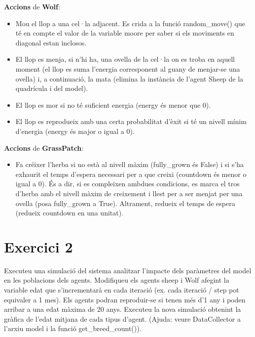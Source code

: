 \documentclass{article} %
\begin{document}
{	\textbf{Accions} de \textbf{Wolf}:

	\begin{itemize}
		\item Mou el llop a una cel·la adjacent. Es crida a la funció {\selectfont\small random\_move()} que té en compte el valor de la variable {\selectfont\small moore} per saber si els moviments en diagonal estan inclosos.
		\item El llop es menja, si n'hi ha, una ovella de la cel·la on es troba en aquell moment (el llop es suma l'energia corresponent al guany de menjar-se una ovella) i, a continuació, la mata (elimina la instància de l'agent {\selectfont\small Sheep} de la quadrícula i del model).
		\item El llop es mor si no té suficient energia ({\selectfont\small energy} és menor que 0).
		\item El llop es reprodueix amb una certa probabilitat d'èxit si té un nivell mínim d'energia ({\selectfont\small energy} és major o igual a 0).
	\end{itemize}

	\textbf{Accions} de \textbf{GrassPatch}:

	\begin{itemize}
		\item Fa créixer l'herba si no està al nivell màxim ({\selectfont\small fully\_grown} és {\selectfont\small False}) i si s'ha exhaurit el temps d'espera necessari per a que creixi ({\selectfont\small countdown} és menor o igual a 0). És a dir, si es compleixen ambdues condicions, es marca el tros d'herba amb el nivell màxim de creixement i llest per a ser menjat per una ovella (posa {\selectfont\small fully\_grown} a {\selectfont\small True}). Altrament, redueix el temps de espera (redueix {\selectfont\small countdown} en una unitat).
	\end{itemize}
}

\section{Exercici 2}
Executeu una simulació del sistema analitzar l'impacte dels paràmetres del model en les poblacions dels agents. Modifiqueu els agents sheep i Wolf afegint la variable edat que s'incrementarà en cada iteració (ex. cada iteració / step pot equivaler a 1 mes). Els agents podran reproduir-se si tenen més d'1 any i poden arribar a una edat màxima de 20 anys. Executeu la nova simulació obtenint la gràfica de l'edat mitjana de cada tipus d'agent. (Ajuda: veure DataCollector a l'arxiu model i la funció get\_breed\_count()). \\
\end{document}
